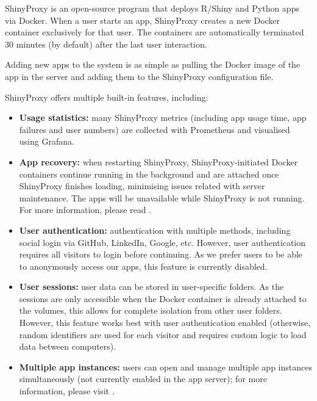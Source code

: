 ShinyProxy is an open-source program that deploys R/Shiny and Python apps via Docker. When a user starts an app, ShinyProxy creates a new Docker container exclusively for that user. The containers are automatically terminated 30 minutes (by default) after the last user interaction.

Adding new apps to the system is as simple as pulling the Docker image of the app in the server and adding them to the ShinyProxy configuration file.


ShinyProxy offers multiple built-in features, including:

\begin{itemize}
	\item \textbf{Usage statistics:} many ShinyProxy metrics (including app usage time, app failures and user numbers) are collected with Prometheus and visualised using Grafana.
    \item \textbf{App recovery:} when restarting ShinyProxy, ShinyProxy-initiated Docker containers continue running in the background and are attached once ShinyProxy finishes loading, minimising issues related with server maintenance. The apps will be unavailable while ShinyProxy is not running. For more information, please read .
    \item \textbf{User authentication:} authentication with multiple methods, including social login via GitHub, LinkedIn, Google, etc. However, user authentication requires all visitors to login before continuing. As we prefer users to be able to anonymously access our apps, this feature is currently disabled.
    \item \textbf{User sessions:} user data can be stored in user-specific folders. As the sessions are only accessible when the Docker container is already attached to the volumes, this allows for complete isolation from other user folders. However, this feature works best with user authentication enabled (otherwise, random identifiers are used for each visitor and requires custom logic to load data between computers).
	\item \textbf{Multiple app instances:} users can open and manage multiple app instances simultaneously (not currently enabled in the app server); for more information, please visit .
\end{itemize}

